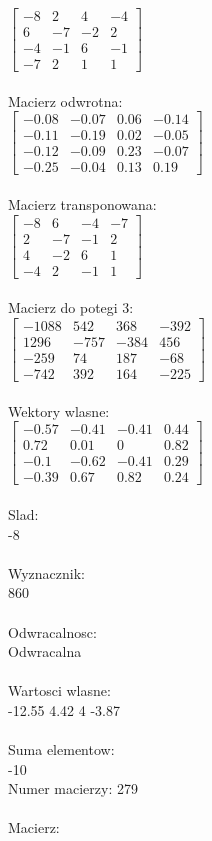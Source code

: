 \documentclass[a4paper,12pt]{article}
\begin{document}
$\begin{bmatrix} -8&2&4&-4\\6&-7&-2&2\\-4&-1&6&-1\\-7&2&1&1 \end{bmatrix}$
\\
\\
Macierz odwrotna:\\

$\begin{bmatrix} -0.08&-0.07&0.06&-0.14\\-0.11&-0.19&0.02&-0.05\\-0.12&-0.09&0.23&-0.07\\-0.25&-0.04&0.13&0.19 \end{bmatrix}$
\\
\\
Macierz transponowana:\\

$\begin{bmatrix} -8&6&-4&-7\\2&-7&-1&2\\4&-2&6&1\\-4&2&-1&1 \end{bmatrix}$
\\
\\
Macierz do potegi 3:\\

$\begin{bmatrix} -1088&542&368&-392\\1296&-757&-384&456\\-259&74&187&-68\\-742&392&164&-225 \end{bmatrix}$
\\
\\
Wektory wlasne:\\

$\begin{bmatrix} -0.57&-0.41&-0.41&0.44\\0.72&0.01&0&0.82\\-0.1&-0.62&-0.41&0.29\\-0.39&0.67&0.82&0.24 \end{bmatrix}$
\\
\\
Slad:\\
-8
\\
\\
Wyznacznik:\\
860
\\
\\
Odwracalnosc:\\
Odwracalna
\\
\\
Wartosci wlasne:\\
-12.55 4.42 4 -3.87
\\
\\
Suma elementow:\\
-10
\\
\newpage
Numer macierzy:
279
\\
\\
Macierz:\\
\end{document}

